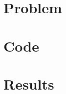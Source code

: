 \documentclass[12pt]{report}
\numberwithin{figure}{chapter}
\begin{document}
\tableofcontents 






\chapter{Problem}


\chapter{Code}


\chapter{Results}
\end{document}
